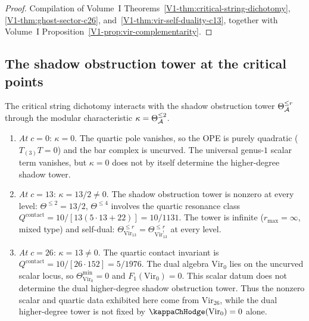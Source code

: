 \begin{proof}
Compilation of Volume~I
Theorems~\ref{V1-thm:critical-string-dichotomy},
\ref{V1-thm:ghost-sector-c26},
and~\ref{V1-thm:vir-self-duality-c13}, together with Volume~I
Proposition~\ref{V1-prop:vir-complementarity}.
\end{proof}

%
%

\subsection{The shadow obstruction tower at the critical points}

The critical string dichotomy interacts with the shadow obstruction tower
$\Theta_{\mathcal{A}}^{\leq r}$ through the modular characteristic
$\kappa = \Theta_{\mathcal{A}}^{\leq 2}$.

\begin{proposition}
\begin{enumerate}[label=\textup{(\roman*)}]
\item \emph{At $c = 0$}: $\kappa = 0$. The quartic pole vanishes, so
the OPE is purely quadratic ($T_{(3)}T = 0$) and the bar complex is
uncurved. The universal genus-$1$ scalar term vanishes, but
$\kappa = 0$ does not by itself determine the higher-degree shadow
tower.

\item \emph{At $c = 13$}: $\kappa = 13/2 \neq 0$. The shadow obstruction tower
is nonzero at every level: $\Theta^{\leq 2} = 13/2$,
$\Theta^{\leq 4}$ involves the quartic resonance class
$Q^{\mathrm{contact}} = 10/[13(5\cdot 13 + 22)] = 10/1131$.
The tower is infinite ($r_{\max} = \infty$, mixed type) and
self-dual: $\Theta_{\mathrm{Vir}_{13}}^{\leq r} =
\Theta_{\mathrm{Vir}_{13}^!}^{\leq r}$ at every level.

\item \emph{At $c = 26$}: $\kappa = 13 \neq 0$. The quartic
contact invariant is
$Q^{\mathrm{contact}} = 10/[26 \cdot 152] = 5/1976$.
The dual algebra $\mathrm{Vir}_0$ lies on the uncurved scalar locus,
so $\Theta_{\mathrm{Vir}_0}^{\min} = 0$ and
$F_1(\mathrm{Vir}_0) = 0$. This scalar datum does not determine the
dual higher-degree shadow obstruction tower. Thus the nonzero scalar and quartic
data exhibited here come from $\mathrm{Vir}_{26}$, while the dual
higher-degree tower is not fixed by $\kappaChHodge(\mathrm{Vir}_0)=0$ alone.
\end{enumerate}
\end{proposition}

